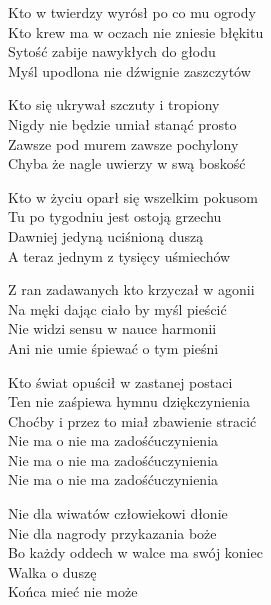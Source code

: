 \begin{text}
    Kto w twierdzy wyrósł po co mu ogrody\\
    Kto krew ma w oczach nie zniesie błękitu\\
    Sytość zabije nawykłych do głodu\\
    Myśl upodlona nie dźwignie zaszczytów

    Kto się ukrywał szczuty i tropiony\\
    Nigdy nie będzie umiał stanąć prosto\\
    Zawsze pod murem zawsze pochylony\\
    Chyba że nagle uwierzy w swą boskość

    Kto w życiu oparł się wszelkim pokusom\\
    Tu po tygodniu jest ostoją grzechu\\
    Dawniej jedyną uciśnioną duszą\\
    A teraz jednym z tysięcy uśmiechów

    Z ran zadawanych kto krzyczał w agonii\\
    Na męki dając ciało by myśl pieścić\\
    Nie widzi sensu w nauce harmonii\\
    Ani nie umie śpiewać o tym pieśni

    Kto świat opuścił w zastanej postaci\\
    Ten nie zaśpiewa hymnu dziękczynienia\\
    Choćby i przez to miał zbawienie stracić\\
    Nie ma o nie ma zadośćuczynienia\\
    Nie ma o nie ma zadośćuczynienia\\
    Nie ma o nie ma zadośćuczynienia

    Nie dla wiwatów człowiekowi dłonie\\
    Nie dla nagrody przykazania boże\\
    Bo każdy oddech w walce ma swój koniec\\
    Walka o duszę\\
    Końca mieć nie może
\end{text}
